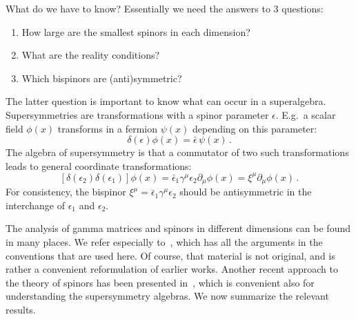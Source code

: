 \documentclass[a4paper,11pt,twoside]{article}
\newcommand{\bitem}[1]{\vspace{-2mm} %
\begin{#1} \setlength{\itemsep}{-5pt} } %
\newcommand{\eitem}[1]{\end{#1}\vspace{-2mm}} %
\begin{document}
What do we have to know? Essentially we need the answers to 3 questions:
 \bitem{enumerate}
  \item How large are the smallest spinors in each dimension?
  \item What are the reality conditions?
  \item Which bispinors are (anti)symmetric?
 \eitem{enumerate}
The latter question is important to know what can occur in a
superalgebra. Supersymmetries are transformations with a spinor parameter
$\epsilon $. E.g.\ a scalar field $\phi (x)$ transforms in a fermion
$\psi (x)$ depending on this parameter:
\begin{equation}
  \delta (\epsilon )\phi(x) =\bar \epsilon\, \psi (x)\,.
 \label{susyscalar}
\end{equation}
The algebra of supersymmetry is that a commutator of two such
transformations leads to general coordinate transformations:
\begin{equation}
  \left[\delta (\epsilon _2)\delta (\epsilon _1)\right] \phi (x)=\bar \epsilon _1\gamma ^\mu
\epsilon _2\partial _\mu \phi(x)= \xi ^\mu\partial _\mu \phi(x)\,.
 \label{susyalgscalar}
\end{equation}
For consistency, the bispinor $\xi^\mu =\bar \epsilon _1\gamma ^\mu
\epsilon _2$ should be antisymmetric in the interchange of $\epsilon_1$
and $\epsilon _2$.

The analysis of gamma matrices and spinors in different dimensions can be
found in many places. We refer especially
to~\cite[section~3]{VanProeyen:1999ni}, which has all the arguments in
the conventions that are used here. Of course, that material is not
original, and is rather a convenient reformulation of earlier works.
Another recent approach to the theory of spinors has been presented
in~\cite{D'Auria:2000ec}, which is convenient also for understanding the
supersymmetry algebras. We now summarize the relevant results.
\end{document}
